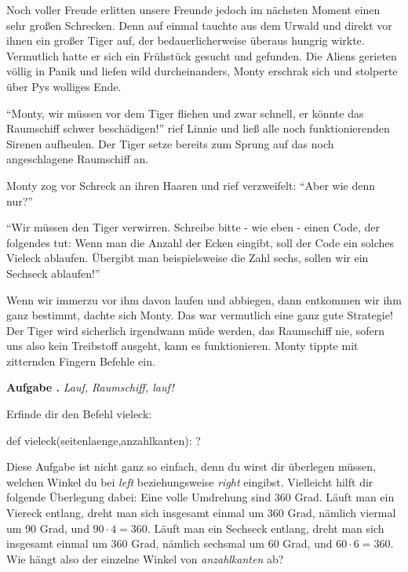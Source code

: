 \documentclass[a5paper,12pt,twoside,openright]{scrbook}
\newlength{\aufgabenskip}
\newcounter{aufgabennummer}
\newenvironment{aufgabeUnshaded}[1]{
  \refstepcounter{aufgabennummer}
  \textbf{Aufgabe \theaufgabennummer.} \emph{#1} \par
}{\vspace{\aufgabenskip}}
\begin{document}
Noch voller Freude erlitten unsere Freunde jedoch im nächsten Moment einen sehr großen Schrecken.
Denn auf einmal tauchte aus dem Urwald und direkt vor ihnen ein großer Tiger auf, der bedauerlicherweise 
überaus hungrig wirkte.
Vermutlich hatte er sich ein Frühstück gesucht und gefunden.
Die Aliens gerieten völlig in Panik und liefen wild durcheinanders, Monty erschrak sich und stolperte 
über Pys wolliges Ende.

"`Monty, wir müssen vor dem Tiger fliehen und zwar schnell, er könnte das Raumschiff schwer beschädigen!"'
rief Linnie und ließ alle noch funktionierenden Sirenen aufheulen.
Der Tiger setze bereits zum Sprung auf das noch angeschlagene Raumschiff an.

Monty zog vor Schreck an ihren Haaren und rief verzweifelt:
``Aber wie denn nur?''

``Wir müssen den Tiger verwirren. Schreibe bitte - wie eben - einen Code, der folgendes tut:
Wenn man die Anzahl der Ecken eingibt, soll der Code ein solches Vieleck ablaufen. 
Übergibt man beispielsweise die Zahl sechs, sollen wir ein Sechseck ablaufen!''

Wenn wir immerzu vor ihm davon laufen und abbiegen, dann entkommen wir ihm ganz bestimmt, 
dachte sich Monty. Das war vermutlich eine ganz gute Strategie!
Der Tiger wird sicherlich irgendwann müde werden, das Raumschiff nie, 
sofern uns also kein Treibstoff ausgeht, kann es funktionieren.
Monty tippte mit zitternden Fingern Befehle ein.

\begin{aufgabeUnshaded}{Lauf, Raumschiff, lauf!}
Erfinde dir den Befehl vieleck:
\begin{pythoncode}
def vieleck(seitenlaenge,anzahlkanten):
    ?
\end{pythoncode}
\end{aufgabeUnshaded}
   
\begin{lip}{}
 Diese Aufgabe ist nicht ganz so einfach, denn du wirst dir überlegen müssen, 
 welchen Winkel du bei \emph{left} beziehungsweise \emph{right} eingibst.
 Vielleicht hilft dir folgende Überlegung dabei:
 Eine volle Umdrehung sind 360 Grad.
 Läuft man ein Viereck entlang, dreht man sich insgesamt einmal um 360 Grad, nämlich viermal um 90 Grad, 
 und $90 \cdot 4 = 360$.
 Läuft man ein Sechseck entlang, dreht man sich insgesamt einmal um 360 Grad, nämlich sechsmal um 60 Grad, 
 und $60 \cdot 6 = 360$. 
 Wie hängt also der einzelne Winkel von \emph{anzahlkanten} ab?
\end{lip}
\end{document}
